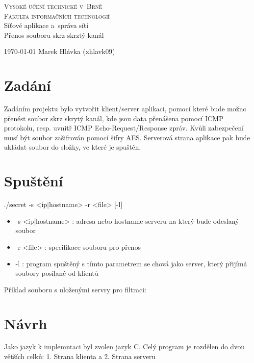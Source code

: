 \documentclass[a4paper, 11pt]{article}
\begin{document}
\begin{titlepage}
	\begin{center}
		\Huge
		\textsc{Vysoké učení technické v~Brně} \\
		\huge
		\textsc{Fakulta informačních technologií} \\
		\LARGE
		Síťové aplikace a~správa sítí\\
		\Huge
		Přenos souboru skrz skrztý kanál
	\end{center}
	{\Large
		\today
		\hfill
		Marek Hlávka (xhlavk09)
	}
\end{titlepage}
\tableofcontents
\newpage

\section{Zadání}
Zadáním projektu bylo vytvořit klient/server aplikaci, pomocí které bude možno přenést soubor skrz skrytý kanál, kde jsou data přenášena pomocí ICMP protokolu, resp. uvnitř ICMP Echo-Request/Response zpráv. Kvůli zabezpečení musí být soubor zašifrován pomocí šifry AES. Serverová strana aplikace pak bude ukládat soubor do složky, ve které je spuštěn.

\section{Spuštění}

\centerline{\large./secret -s <ip|hostname> -r <file> [-l]}
\begin{itemize}
\item -s <ip|hostname> : adresa nebo hostname serveru na který bude odeslaný soubor
\item -r <file> : specifikace souboru pro přenos
\item -l : program spuštěný s tímto parametrem se chová jako server, který přijímá soubory posílané od klientů
\end{itemize}
Příklad souboru s uloženými servry pro filtraci:\\
\begin{figure}[h]
\end{figure}

\section{Návrh}
Jako jazyk k implemntaci byl zvolen jazyk C. Celý program je rozdělen do dvou větších celků: 1. Strana klienta a 2. Strana serveru
\end{document}
